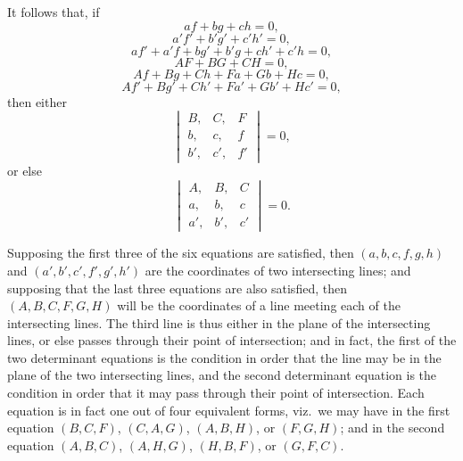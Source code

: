 \documentclass[11pt,a4paper]{article}
\begin{document}
It follows that, if
\[
af + bg + ch = 0,
\]
\[
a'f' + b'g' + c'h' = 0,
\]
\[
af' + a'f + bg' + b'g + ch' + c'h = 0,
\]
\[
AF + BG + CH = 0,
\]
\[
Af + Bg + Ch + Fa + Gb + Hc = 0,
\]
\[
Af' + Bg' + Ch' + Fa' + Gb' + Hc' = 0,
\]
then either
\[
\begin{vmatrix} B, & C, & F \\ b, & c, & f \\ b', & c', & f' \end{vmatrix} = 0,
\]
or else
\[
\begin{vmatrix} A, & B, & C \\ a, & b, & c \\ a', & b', & c' \end{vmatrix} = 0.
\]

Supposing the first three of the six equations are satisfied, then $(a, b, c, f, g, h)$ and $(a', b', c', f', g', h')$ are the coordinates of two intersecting lines; and supposing that the last three equations are also satisfied, then $(A, B, C, F, G, H)$ will be the coordinates of a line meeting each of the intersecting lines. The third line is thus either in the plane of the intersecting lines, or else passes through their point of intersection; and in fact, the first of the two determinant equations is the condition in order that the line may be in the plane of the two intersecting lines, and the second determinant equation is the condition in order that it may pass through their point of intersection. Each equation is in fact one out of four equivalent forms, viz.\ we may have in the first equation $(B, C, F)$, $(C, A, G)$, $(A, B, H)$, or $(F, G, H)$; and in the second equation $(A, B, C)$, $(A, H, G)$, $(H, B, F)$, or $(G, F, C)$.
\end{document}

